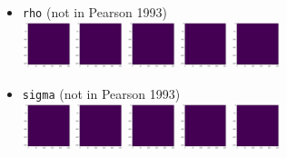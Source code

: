 \begin{itemize}
\item {\tt rho} (not in Pearson 1993)\\
\includegraphics[width=1.4cm]{python_codes/fieldstone_171/pearson93/rho_solution_0001000_u}
\includegraphics[width=1.4cm]{python_codes/fieldstone_171/pearson93/rho_solution_0010000_u}
\includegraphics[width=1.4cm]{python_codes/fieldstone_171/pearson93/rho_solution_0030000_u}
\includegraphics[width=1.4cm]{python_codes/fieldstone_171/pearson93/rho_solution_0050000_u}
\includegraphics[width=1.4cm]{python_codes/fieldstone_171/pearson93/rho_solution_final_u}

\item {\tt sigma} (not in Pearson 1993)\\
\includegraphics[width=1.4cm]{python_codes/fieldstone_171/pearson93/sigma_solution_0001000_u}
\includegraphics[width=1.4cm]{python_codes/fieldstone_171/pearson93/sigma_solution_0010000_u}
\includegraphics[width=1.4cm]{python_codes/fieldstone_171/pearson93/sigma_solution_0030000_u}
\includegraphics[width=1.4cm]{python_codes/fieldstone_171/pearson93/sigma_solution_0050000_u}
\includegraphics[width=1.4cm]{python_codes/fieldstone_171/pearson93/sigma_solution_final_u}

\end{itemize}

